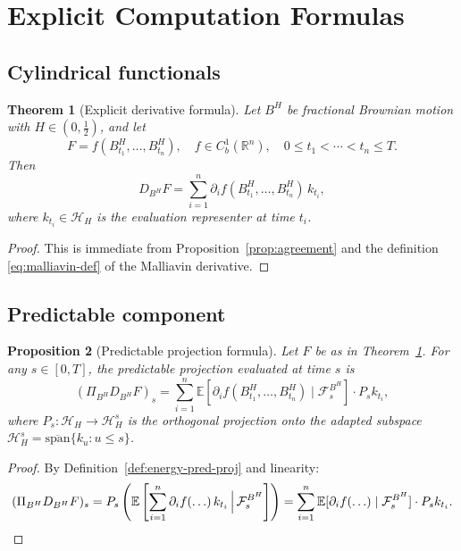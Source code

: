 \documentclass[11pt,a4paper]{article}
\theoremstyle{plain}
\newtheorem{theorem}{Theorem}[section]
\newtheorem{proposition}[theorem]{Proposition}
\theoremstyle{definition}
\theoremstyle{remark}
\newcommand{\R}{\mathbb{R}}
\newcommand{\E}{\mathbb{E}}
\newcommand{\Fs}{\mathcal{F}_s}
\newcommand{\HH}{\mathcal{H}_H}
\begin{document}
\section{Explicit Computation Formulas}\label{sec:explicit}

\subsection{Cylindrical functionals}

\begin{theorem}[Explicit derivative formula]\label{thm:explicit-formula}
Let $B^H$ be fractional Brownian motion with $H \in (0, \frac{1}{2})$, and let
\[
F = f(B^H_{t_1}, \ldots, B^H_{t_n}), \quad f \in C^1_b(\R^n), \quad 0 \leq t_1 < \cdots < t_n \leq T.
\]
Then
\begin{equation}\label{eq:explicit-DX}
D_{B^H} F = \sum_{i=1}^n \partial_i f(B^H_{t_1}, \ldots, B^H_{t_n}) \, k_{t_i},
\end{equation}
where $k_{t_i} \in \HH$ is the evaluation representer at time $t_i$.
\end{theorem}

\begin{proof}
This is immediate from Proposition~\ref{prop:agreement} and the definition \eqref{eq:malliavin-def} of the Malliavin derivative.
\end{proof}

\subsection{Predictable component}

\begin{proposition}[Predictable projection formula]\label{prop:pred-proj}
Let $F$ be as in Theorem~\ref{thm:explicit-formula}. For any $s \in [0, T]$, the predictable projection evaluated at time $s$ is
\begin{equation}\label{eq:pred-proj}
(\Pi_{B^H} D_{B^H} F)_s = \sum_{i=1}^n \E[\partial_i f(B^H_{t_1}, \ldots, B^H_{t_n}) \mid \Fs^{B^H}] \cdot P_s k_{t_i},
\end{equation}
where $P_s : \HH \to \HH^s$ is the orthogonal projection onto the adapted subspace $\HH^s = \overline{\mathrm{span}}\{k_u : u \leq s\}$.
\end{proposition}

\begin{proof}
By Definition~\ref{def:energy-pred-proj} and linearity:
\[
(\Pi_{B^H} D_{B^H} F)_s = P_s\left(\E\left[\sum_{i=1}^n \partial_i f(\ldots) \, k_{t_i} \,\Big|\, \Fs^{B^H}\right]\right) = \sum_{i=1}^n \E[\partial_i f(\ldots) \mid \Fs^{B^H}] \cdot P_s k_{t_i}. \qedhere
\]
\end{proof}
\end{document}
